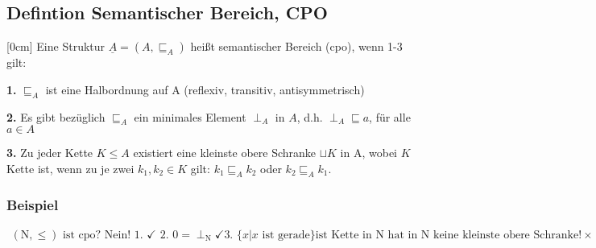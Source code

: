 \subsection{Defintion Semantischer Bereich, CPO}
[0cm]
Eine Struktur $\underline{A}=(A,\sqsubseteq_A)$ heißt semantischer Bereich (cpo), wenn 1-3 gilt:
\begin{compactitem}
	\item[\textbf{1.}] $\sqsubseteq_A$ ist eine Halbordnung auf A (reflexiv, transitiv, antisymmetrisch)
	\item[\textbf{2.}] Es gibt bezüglich $\sqsubseteq_A$ ein minimales Element $\perp_A$ in $A$, d.h. $\perp_A \sqsubseteq a$, für alle $a \in A$
	\item[\textbf{3.}] Zu jeder Kette $K \leq A$ existiert eine kleinste obere Schranke $\sqcup K$ in A, wobei $K$ Kette ist, wenn zu je zwei $k_1, k_2 \in K$ gilt: $k_1\sqsubseteq_A k_2$ oder $k_2 \sqsubseteq_A k_1$.
\subsubsection*{Beispiel}
\begin{align*}
(\mathrm{N}, \leq)\text{ ist cpo? Nein! 1. } \checkmark \text{ 2. } 0 = \perp_\mathrm{N}\checkmark \text{3. } \{x | x \text{ ist gerade}\} \text{ist Kette in } \mathrm{N}\text{ hat in } \mathrm{N}\text{ keine kleinste obere Schranke!} \times\\
\end{align*}

\end{compactitem}
